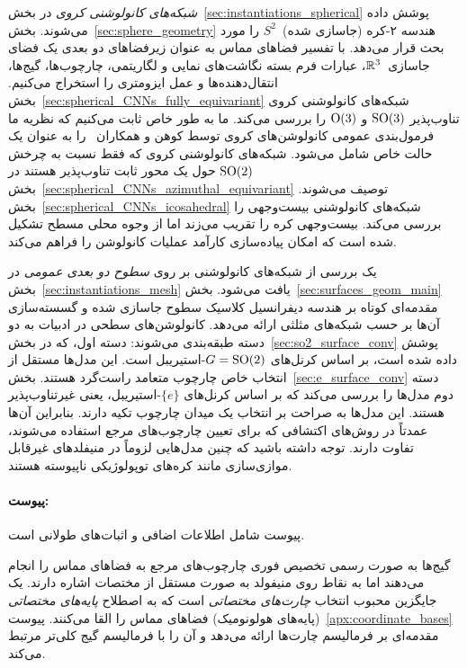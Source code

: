 \emph{شبکه‌های کانولوشنی کروی} در بخش~\ref{sec:instantiations_spherical} پوشش داده می‌شوند.
بخش~\ref{sec:sphere_geometry} هندسه ۲-کره (جاسازی شده)~$S^2$ را مورد بحث قرار می‌دهد.
با تفسیر فضاهای مماس به عنوان زیرفضاهای دو بعدی یک فضای جاسازی~$\mathbb{R}^3$، عبارات فرم بسته نگاشت‌های نمایی و لگاریتمی، چارچوب‌ها، گیج‌ها، انتقال‌دهنده‌ها و عمل ایزومتری را استخراج می‌کنیم.
بخش~\ref{sec:spherical_CNNs_fully_equivariant} شبکه‌های کانولوشنی کروی تناوب‌پذیر $\operatorname{SO}(3)$ و $\operatorname{O}(3)$ را بررسی می‌کند.
ما به طور خاص ثابت می‌کنیم که نظریه ما فرمول‌بندی عمومی کانولوشن‌های کروی توسط کوهن و همکاران~\cite{Cohen2019-generaltheory} را به عنوان یک حالت خاص شامل می‌شود.
شبکه‌های کانولوشنی کروی که فقط نسبت به چرخش $\operatorname{SO}(2)$ حول یک محور ثابت تناوب‌پذیر هستند در بخش~\ref{sec:spherical_CNNs_azimuthal_equivariant} توصیف می‌شوند.
بخش~\ref{sec:spherical_CNNs_icosahedral} شبکه‌های کانولوشنی بیست‌وجهی را بررسی می‌کند.
بیست‌وجهی کره را تقریب می‌زند اما از وجوه محلی مسطح تشکیل شده است که امکان پیاده‌سازی کارآمد عملیات کانولوشن را فراهم می‌کند.

یک بررسی از شبکه‌های کانولوشنی بر روی \emph{سطوح دو بعدی عمومی} در بخش~\ref{sec:instantiations_mesh} یافت می‌شود.
بخش~\ref{sec:surfaces_geom_main} مقدمه‌ای کوتاه بر هندسه دیفرانسیل کلاسیک سطوح جاسازی شده و گسسته‌سازی آن‌ها بر حسب شبکه‌های مثلثی ارائه می‌دهد.
کانولوشن‌های سطحی در ادبیات به دو دسته طبقه‌بندی می‌شوند:
دسته اول، که در بخش~\ref{sec:so2_surface_conv} پوشش داده شده است، بر اساس کرنل‌های $G=\operatorname{SO}(2)$-استیریبل است.
این مدل‌ها مستقل از انتخاب خاص چارچوب متعامد راست‌گرد هستند.
بخش~\ref{sec:e_surface_conv} دسته دوم مدل‌ها را بررسی می‌کند که بر اساس کرنل‌های $\{e\}$-استیریبل، یعنی غیرتناوب‌پذیر هستند.
این مدل‌ها به صراحت بر انتخاب یک میدان چارچوب تکیه دارند.
بنابراین آن‌ها عمدتاً در روش‌های اکتشافی که برای تعیین چارچوب‌های مرجع استفاده می‌شوند، تفاوت دارند.
توجه داشته باشید که چنین مدل‌هایی لزوماً در منیفلدهای غیرقابل موازی‌سازی مانند کره‌های توپولوژیکی ناپیوسته هستند.


\paragraph{پیوست:}

پیوست شامل اطلاعات اضافی و اثبات‌های طولانی است.

گیج‌ها به صورت رسمی تخصیص فوری چارچوب‌های مرجع به فضاهای مماس را انجام می‌دهند اما به نقاط روی منیفولد به صورت مستقل از مختصات اشاره دارند.
یک جایگزین محبوب انتخاب \emph{چارت‌های مختصاتی} است که به اصطلاح \emph{پایه‌های مختصاتی} (پایه‌های هولونومیک) فضاهای مماس را القا می‌کنند.
پیوست~\ref{apx:coordinate_bases} مقدمه‌ای بر فرمالیسم چارت‌ها ارائه می‌دهد و آن را با فرمالیسم گیج کلی‌تر مرتبط می‌کند.

